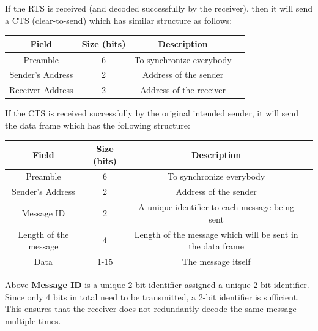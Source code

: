 \documentclass[a4paper,12pt]{article}
\begin{document}
If the RTS is received (and decoded successfully by the receiver), then it will send a CTS (clear-to-send) which has similar structure as follows:
\begin{center}
    \begin{tabular}{|c|c|c|c|}
    \hline
    \textbf{Field} & \textbf{Size (bits)} & \textbf{Description} \\ 
    \hline
    Preamble & 6 & To synchronize everybody  \\ 
    \hline
    Sender's Address & 2 & Address of the sender \\ 
    \hline
    Receiver Address & 2 & Address of the receiver\\ 
    \hline
    \end{tabular}
\end{center}


If the CTS is received successfully by the original intended sender, it will send the data frame which has the following structure:
\begin{center}
    \begin{tabular}{|c|c|c|c|}
    \hline
    \textbf{Field} & \textbf{Size (bits)} & \textbf{Description} \\ 
    \hline
    Preamble & 6 & To synchronize everybody  \\ 
    \hline
    Sender's Address & 2 & Address of the sender \\ 
    \hline
    Message ID & 2 & A unique identifier to each message being sent\\ 
    \hline
    Length of the message & 4 & Length of the message which will be sent in the data frame \\ 
    \hline
    Data & 1-15 & The message itself \\ 
    \hline
    \end{tabular}
\end{center}

Above \textbf{Message ID} is a unique 2-bit identifier assigned a unique 2-bit identifier. Since only 4 bits in total need to be transmitted, a 2-bit identifier is sufficient. This ensures that the receiver does not redundantly decode the same message multiple times. \\
\end{document}
